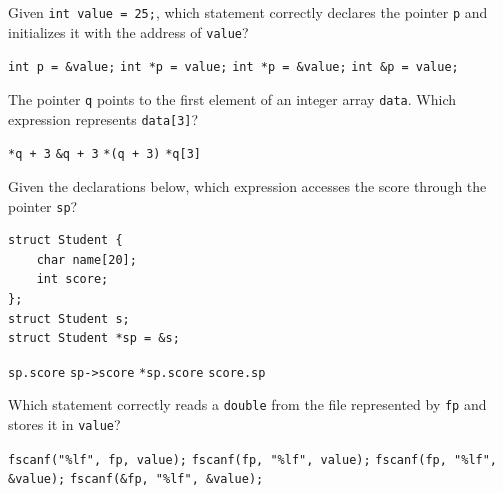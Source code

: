 \documentclass[12pt,a4paper,answers,addpoints]{exam}
\begin{document}
\begin{questions}
\addpoints

\newpage
{}

\question[2] Given \texttt{int value = 25;}, which statement correctly declares
the pointer \texttt{p} and initializes it with the address of \texttt{value}?
\begin{choices}
    \choice \texttt{int p = \&value;}
    \choice \texttt{int *p = value;}
    \choice \texttt{int *p = \&value;}
    \choice \texttt{int \&p = value;}
\end{choices}

\question[2] The pointer \texttt{q} points to the first element of an integer array
\texttt{data}. Which expression represents \texttt{data[3]}?
\begin{oneparchoices}
    \choice \texttt{*q + 3}
    \choice \texttt{\&q + 3}
    \choice \texttt{*(q + 3)}
    \choice \texttt{*q[3]}
\end{oneparchoices}

\question[2] Given the declarations below, which expression accesses the score
through the pointer \texttt{sp}?
\begin{lstlisting}[style=examc]
struct Student {
    char name[20];
    int score;
};
struct Student s;
struct Student *sp = &s;
\end{lstlisting}
\begin{oneparchoices}
    \choice \texttt{sp.score}
    \choice \texttt{sp->score}
    \choice \texttt{*sp.score}
    \choice \texttt{score.sp}
\end{oneparchoices}

\question[2] Which statement correctly reads a \texttt{double} from the file
represented by \texttt{fp} and stores it in \texttt{value}?
\begin{choices}
    \choice \texttt{fscanf("\%lf", fp, value);}
    \choice \texttt{fscanf(fp, "\%lf", value);}
    \choice \texttt{fscanf(fp, "\%lf", \&value);}
    \choice \texttt{fscanf(\&fp, "\%lf", \&value);}
\end{choices}


\end{questions}
\end{document}
